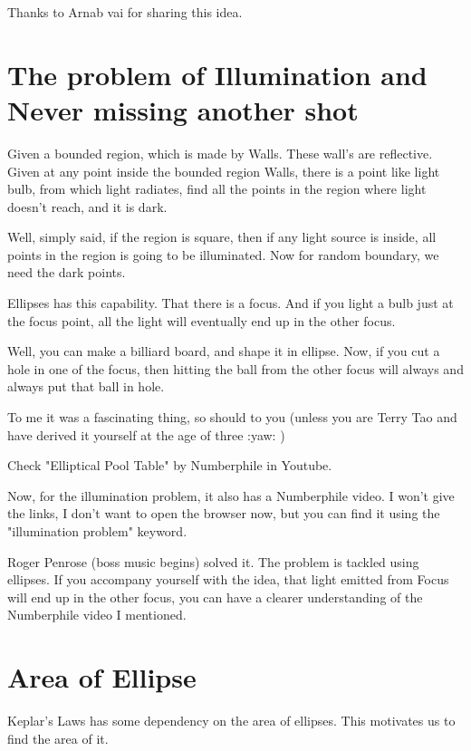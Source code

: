 \documentclass[11pt,a4paper]{article}
\newcommand{ \pk }[1]{\begin{problem} #1 \end{problem} }
\begin{document}
Thanks to Arnab vai for sharing this idea. 


\section{ The problem of Illumination and Never missing another shot }
\pk{ Given a bounded region, which is made by Walls. These wall's are reflective. Given at any point inside the bounded region Walls, there is a point like light bulb, from which light radiates, find all the points in the region where light doesn't reach, and it is dark. }

Well, simply said, if the region is square, then if any light source is inside, all points in the region is going to be illuminated. Now for random boundary, we need the dark points. 

Ellipses has this capability. That there is a focus. And if you light a bulb just at the focus point, all the light will eventually end up in the other focus. 

Well, you can make a billiard board, and shape it in ellipse. Now, if you cut a hole in one of the focus, then hitting the ball from the other focus will always and always put that ball in hole.

To me it was a fascinating thing, so should to you (unless you are Terry Tao and have derived it yourself at the age of three :yaw: ) 

Check "Elliptical Pool Table" by Numberphile in Youtube. 

Now, for the illumination problem, it also has a Numberphile video. I won't give the links, I don't want to open the browser now, but you can find it using the "illumination problem" keyword. 

Roger Penrose (boss music begins) solved it. The problem is tackled using ellipses. If you accompany yourself with the idea, that light emitted from Focus will end up in the other focus, you can have a clearer understanding of the Numberphile video I mentioned.
















\newpage

\section{ Area of Ellipse }
Keplar's Laws has some dependency on the area of ellipses. This motivates us to find the area of it.
\end{document}
